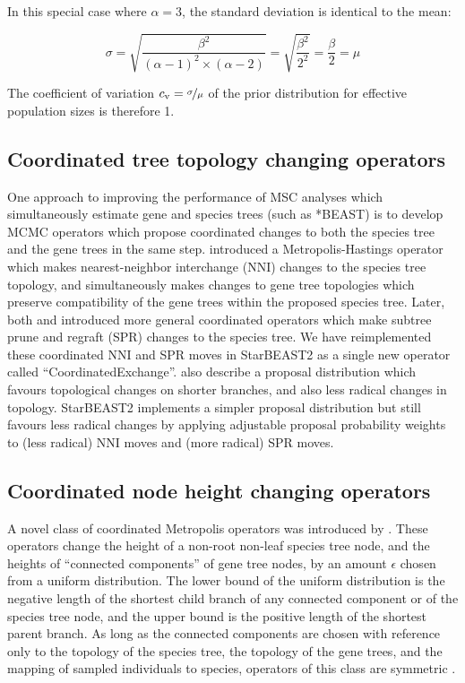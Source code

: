 \documentclass[12pt]{article}
\begin{document}
In this special case where $\alpha = 3$, the standard deviation is identical to
the mean:

\begin{equation}
\sigma = \sqrt{\frac{\beta^2}{(\alpha - 1)^2 \times (\alpha - 2)}} = \sqrt{\frac{\beta^2}{2^2}} = \frac{\beta}{2} = \mu
\end{equation}

The coefficient of variation $c_\mathrm{v} = \nicefrac{\sigma}{\mu}$ of the
prior distribution for effective population sizes is therefore 1.

\subsection{Coordinated tree topology changing operators}

One approach to improving the performance of MSC analyses which simultaneously
estimate gene and species trees (such as *BEAST) is to develop MCMC operators
which propose coordinated changes to both the species tree and the gene trees in
the same step. \cite{Yang01122014} introduced a Metropolis-Hastings \citep[MH;][]{Metropolis1953, Hastings1970}
operator which makes nearest-neighbor interchange (NNI) changes to the species
tree topology, and simultaneously makes changes to gene tree topologies which
preserve compatibility of the gene trees within the proposed species tree.
Later, both \cite{Jones2016} and \cite{2015arXiv151203843R} introduced more
general coordinated operators which make subtree prune and regraft (SPR) changes
to the species tree. We have reimplemented these coordinated NNI and SPR moves
in StarBEAST2 as a single new operator called ``CoordinatedExchange''.
\cite{2015arXiv151203843R} also describe a proposal distribution which favours
topological changes on shorter branches, and also less radical changes in
topology. StarBEAST2 implements a simpler proposal distribution but still
favours less radical changes by applying adjustable proposal probability weights
to (less radical) NNI moves and (more radical) SPR moves.

\subsection{Coordinated node height changing operators}

A novel class of coordinated Metropolis operators was introduced by
\cite{Jones2016}. These operators change the height of a non-root non-leaf
species tree node, and the heights of ``connected components'' of gene tree
nodes, by an amount $\epsilon$ chosen from a uniform distribution.
The lower bound of the uniform distribution is the negative length of
the shortest child branch of any connected component or of the species tree node,
and the upper bound is the positive length of the shortest parent branch. As
long as the connected components are chosen with reference only to the topology
of the species tree, the topology of the gene trees, and the mapping of
sampled individuals to species, operators of this class are symmetric
\citep{Jones2016}.
\end{document}

